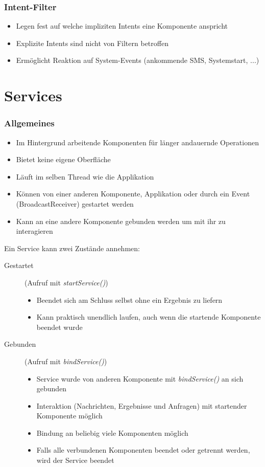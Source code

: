 \begin{frame}[label=intent_filters]
   \frametitle{Intent-Filter}
   \begin{itemize}
      \item Legen fest auf welche impliziten Intents eine Komponente anspricht
      \item Explizite Intents sind nicht von Filtern betroffen
      \item Ermöglicht Reaktion auf System-Events (ankommende SMS, Systemstart, ...)
   \end{itemize}

   
\end{frame}

\section{Services}
\begin{frame}[label=services]
   \frametitle{Allgemeines}
   \begin{itemize}
      \item Im Hintergrund arbeitende Komponenten für länger andauernde Operationen
      \item Bietet keine eigene Oberfläche
      \item Läuft im selben Thread wie die Applikation
      \item Können von einer anderen Komponente, Applikation oder durch ein 
         Event (BroadcastReceiver) gestartet werden
      \item Kann an eine andere Komponente gebunden werden um mit ihr zu interagieren
   \end{itemize}

   Ein Service kann zwei Zustände annehmen:

   \begin{description}
   \item[Gestartet] (Aufruf mit \emph{startService()})
      \begin{itemize}
         \item Beendet sich am Schluss selbst ohne ein Ergebnis zu liefern
         \item Kann praktisch unendlich laufen, auch wenn die startende 
            Komponente beendet wurde
      \end{itemize}  
   \item[Gebunden] (Aufruf mit \emph{bindService()})
      \begin{itemize}
         \item Service wurde von anderen Komponente mit \emph{bindService()} an sich gebunden 
         \item Interaktion (Nachrichten, Ergebnisse und Anfragen) mit startender Komponente möglich
         \item Bindung an beliebig viele Komponenten möglich
         \item Falls alle verbundenen Komponenten beendet oder getrennt werden, 
            wird der Service beendet
      \end{itemize}  
   \end{description}
\end{frame}

